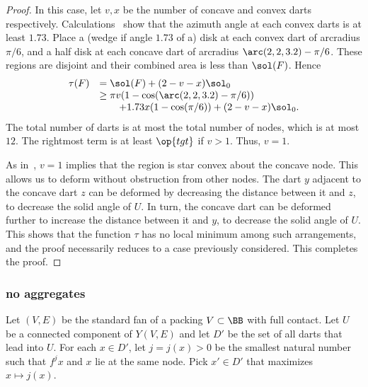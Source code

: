 \begin{proof}
 In this case,
let $v,x$ be the number of concave and convex darts respectively.
Calculations~\cite[cc:lft]{hales:2009:nonlinear} show that the azimuth
angle at each convex darts is at least $1.73$.  Place a (wedge if
angle $1.73$ of a) disk at each convex dart of arcradius $\pi/6$, and
a half disk at each concave dart of arcradius $\arc(2,2,3.2)-\pi/6$.
These regions are disjoint and their combined area is less than
$\sol(F)$.  Hence
\begin{displaymath}
\begin{array}{lll}
\tau(F)&=\sol(F)+(2-v-x)\sol_0 \\
&\ge \pi v (1-\cos(\arc(2,2,3.2)-\pi/6)) \\
&\qquad+ 1.73 x (1-\cos(\pi/6)) + (2-v-x)\sol_0.
\end{array}
\end{displaymath}
The total number of darts is at most the total number of nodes, which
is at most $12$.  The rightmost term is at least $\op{tgt}$ if $v>
1$. Thus, $v=1$.  %
%

As in~\cite{Hales:2006:DCG}, $v=1$ implies that the region is star
convex about the concave node.  This allows us to deform without
obstruction from other nodes.  The dart $y$ adjacent to the concave
dart $z$ can be deformed by decreasing the distance between it and
$z$, to decrease the solid angle of $U$.  In turn, the concave dart
can be deformed further to increase the distance between it and $y$,
to decrease the solid angle of $U$.  This shows that the function
$\tau$ has no local minimum among such arrangements, and the proof
necessarily reduces to a case previously considered.  This completes
the proof.
\end{proof}
%
%

\subsubsection{no aggregates}

Let $(V,E)$ be the standard fan of a packing $V\subset \BB$ with full
contact.  Let $U$ be a connected component of $Y(V,E)$ and let $D'$ be
the set of all darts that lead into $U$.  For each $x\in D'$, let $j =
j(x) >0$ be the smallest natural number such that $f^j x$ and $x$ lie
at the same node.  Pick $x'\in D'$ that maximizes $x\mapsto j(x)$.
%
%

